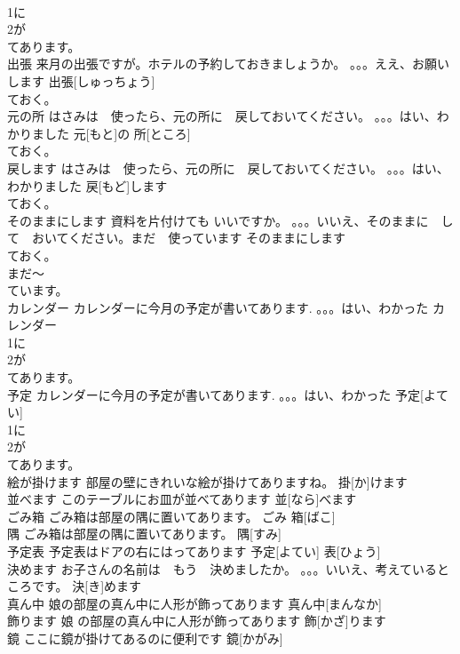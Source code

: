 \documentclass[8pt]{extreport}
\begin{document}
\begin{CJK}{UTF8}{min}
\\	1に
\\	2が
\\	てあります。
\\	出張	来月の出張ですが。ホテルの予約しておきましょうか。 。。。ええ、お願いします	出張[しゅっちょう]			
\\	ておく。
\\	元の所	はさみは　使ったら、元の所に　戻しておいてください。 。。。はい、わかりました	元[もと]の 所[ところ]				
\\	ておく。
\\	戻します	はさみは　使ったら、元の所に　戻しておいてください。 。。。はい、わかりました	戻[もど]します			
\\	ておく。
\\	そのままにします	資料を片付けても いいですか。 。。。いいえ、そのままに　して　おいてください。まだ　使っています	そのままにします				
\\	ておく。
\\	まだ～
\\	ています。
\\	カレンダー	カレンダーに今月の予定が書いてあります. 。。。はい、わかった	カレンダー				
\\	1に
\\	2が
\\	てあります。
\\	予定	カレンダーに今月の予定が書いてあります. 。。。はい、わかった	予定[よてい]				
\\	1に
\\	2が
\\	てあります。
\\	絵が掛けます	部屋の壁にきれいな絵が掛けてありますね。	掛[か]けます					
\\	並べます	このテーブルにお皿が並べてあります	並[なら]べます			
\\	ごみ箱	ごみ箱は部屋の隅に置いてあります。	ごみ 箱[ばこ]			
\\	隅	ごみ箱は部屋の隅に置いてあります。	隅[すみ]					
\\	予定表	予定表はドアの右にはってあります	予定[よてい] 表[ひょう]			
\\	決めます	お子さんの名前は　もう　決めましたか。 。。。いいえ、考えているところです。	決[き]めます					
\\	真ん中	娘の部屋の真ん中に人形が飾ってあります	真ん中[まんなか]					
\\	飾ります	娘 の部屋の真ん中に人形が飾ってあります	飾[かざ]ります			
\\	鏡	ここに鏡が掛けてあるのに便利です	鏡[かがみ]					

\end{CJK}
\end{document}
